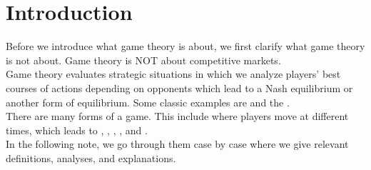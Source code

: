 \section{Introduction}
Before we introduce what game theory is about, we first clarify what game theory is not about. Game theory is NOT about competitive markets. \\
Game theory evaluates strategic situations in which we analyze players' best courses of actions depending on opponents which lead to a Nash equilibrium or another form of equilibrium. Some classic examples are  and the . \\
There are many forms of a game. This include  where players move at different times,  which leads to , , , , and . \\
In the following note, we go through them case by case where we give relevant definitions, analyses, and explanations.

\newpage